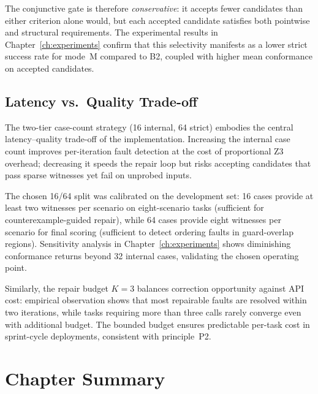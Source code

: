 The conjunctive gate is therefore \emph{conservative}: it accepts fewer
candidates than either criterion alone would, but each accepted candidate
satisfies both pointwise and structural requirements.  The experimental
results in Chapter~\ref{ch:experiments} confirm that this selectivity
manifests as a lower strict success rate for mode~M compared to B2, coupled
with higher mean conformance on accepted candidates.

\subsection{Latency vs.\ Quality Trade-off}

The two-tier case-count strategy (16 internal, 64 strict) embodies the
central latency--quality trade-off of the implementation.  Increasing the
internal case count improves per-iteration fault detection at the cost of
proportional Z3 overhead; decreasing it speeds the repair loop but risks
accepting candidates that pass sparse witnesses yet fail on unprobed inputs.

The chosen 16/64 split was calibrated on the development set: 16 cases
provide at least two witnesses per scenario on eight-scenario tasks (sufficient
for counterexample-guided repair), while 64 cases provide eight witnesses
per scenario for final scoring (sufficient to detect ordering faults in
guard-overlap regions).  Sensitivity analysis in
Chapter~\ref{ch:experiments} shows diminishing conformance returns beyond
32 internal cases, validating the chosen operating point.

Similarly, the repair budget $K = 3$ balances correction opportunity against
API cost: empirical observation shows that most repairable faults are resolved
within two iterations, while tasks requiring more than three calls rarely
converge even with additional budget.  The bounded budget ensures
predictable per-task cost in sprint-cycle deployments, consistent with
principle~P2.

\section*{Chapter Summary}


